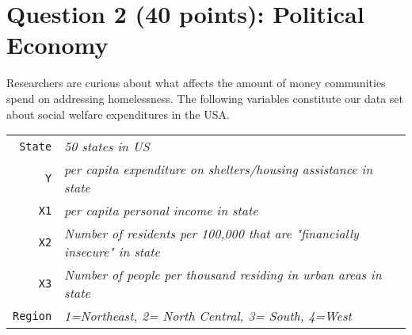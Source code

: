 \documentclass[12pt,letterpaper]{article}
\begin{document}
\newpage

	\section*{Question 2 (40 points): Political Economy}

\noindent Researchers are curious about what affects the amount of money communities spend on addressing homelessness. The following variables constitute our data set about social welfare expenditures in the USA. \\
\vspace{.5cm}


\begin{tabular}{r|l}
	\texttt{State} &\emph{50 states in US} \\
	\texttt{Y} & \emph{per capita expenditure on shelters/housing assistance in state}\\
	\texttt{X1} &\emph{per capita personal income in state} \\
	\texttt{X2} &  \emph{Number of residents per 100,000 that are "financially insecure" in state}\\
	\texttt{X3} &  \emph{Number of people per thousand residing in urban areas in state} \\
	\texttt{Region} &  \emph{1=Northeast, 2= North Central, 3= South, 4=West} \\
\end{tabular}
\end{document}
